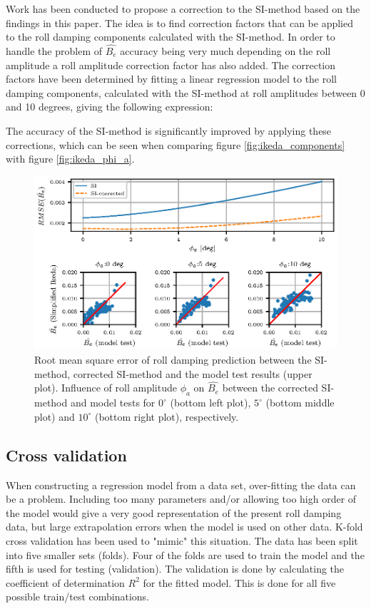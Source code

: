 Work has been conducted to propose a correction to the SI-method based on the findings in this paper. The idea is to find correction factors that can be applied to the roll damping components calculated with the SI-method. In order to handle the problem of $\hat{B_e}$ accuracy being very much depending on the roll amplitude a roll amplitude correction factor has also added. The correction factors have been determined by fitting a linear regression model to the roll damping components, calculated with the SI-method at roll amplitudes between 0 and 10 degrees, giving the following expression: 

The accuracy of the SI-method is significantly improved by applying these corrections, which can be seen when comparing figure \ref{fig:ikeda_components} with figure \ref{fig:ikeda_phi_a}. 

\begin{figure}[H]
\vspace{-0.5cm}
\centering
  \centering
  \includegraphics[]{figures/ikeda_corrected_phi_a.eps}
  \vspace{-0.5cm}
  \caption{Root mean square error of roll damping prediction between the SI-method, corrected SI-method and the model test results (upper plot). Influence of roll amplitude $\phi_a$ on $\hat{B_e}$ between the corrected SI-method and model tests for $0^{\circ}$ (bottom left plot), $5^{\circ}$ (bottom middle plot) and $10^{\circ}$ (bottom right plot), respectively.}
  \label{fig:ikeda_phi_a_correction}
\end{figure}

\subsection{Cross validation}
When constructing a regression model from a data set, over-fitting the data can be a problem. Including too many parameters and/or allowing too high order of the model would give a very good representation of the present roll damping data, but large extrapolation errors when the model is used on other data. K-fold cross validation has been used to "mimic" this situation. The data has been split into five smaller sets (folds). Four of the folds are used to train the model and the fifth is used for testing (validation). The validation is done by calculating the coefficient of determination $R^2$ for the fitted model. This is done for all five possible train/test combinations.      
